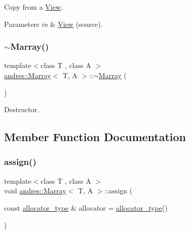 Copy from a \hyperlink{classandres_1_1View}{View}.


\begin{DoxyParams}{Parameters}
{\em in} & \hyperlink{classandres_1_1View}{View} (source). \\
\hline
\end{DoxyParams}
\mbox{\label{classandres_1_1Marray_a6b900bedc740214e8b60684a8b0ad621}} 
\subsubsection{\texorpdfstring{$\sim$\+Marray()}{~Marray()}}
{\footnotesize\ttfamily template$<$class T , class A $>$ \\
\hyperlink{classandres_1_1Marray}{andres\+::\+Marray}$<$ T, A $>$\+::$\sim$\hyperlink{classandres_1_1Marray}{Marray} (\begin{DoxyParamCaption}{ }\end{DoxyParamCaption})\hspace{0.3cm}{\ttfamily [inline]}}

Destructor. 

\subsection{Member Function Documentation}
\mbox{\label{classandres_1_1Marray_a680a02cc61393dddb44fb88e337f29b7}} 
\subsubsection{\texorpdfstring{assign()}{assign()}}
{\footnotesize\ttfamily template$<$class T , class A $>$ \\
void \hyperlink{classandres_1_1Marray}{andres\+::\+Marray}$<$ T, A $>$\+::assign (\begin{DoxyParamCaption}\item[{const \hyperlink{classandres_1_1Marray_a1e38873cb38bd8568be81bfb804deefd}{allocator\+\_\+type} \&}]{allocator = {\ttfamily \hyperlink{classandres_1_1Marray_a1e38873cb38bd8568be81bfb804deefd}{allocator\+\_\+type}()} }\end{DoxyParamCaption})\hspace{0.3cm}{\ttfamily [inline]}}

